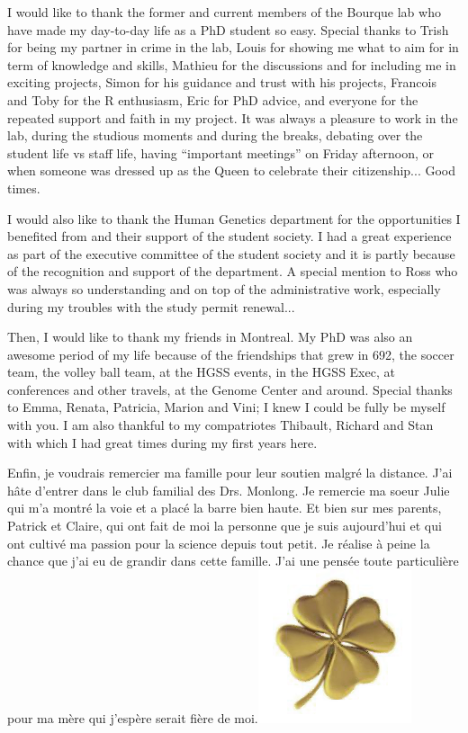 I would like to thank the former and current members of the Bourque lab who have made my day-to-day life as a PhD student so easy.
Special thanks to Trish for being my partner in crime in the lab, Louis for showing me what to aim for in term of knowledge and skills, Mathieu for the discussions and for including me in exciting projects, Simon for his guidance and trust with his projects, Francois and Toby for the R enthusiasm, Eric for PhD advice, and everyone for the repeated support and faith in my project.
It was always a pleasure to work in the lab, during the studious moments and during the breaks, debating over the student life vs staff life, having ``important meetings'' on Friday afternoon, or when someone was dressed up as the Queen to celebrate their citizenship... Good times.

I would also like to thank the Human Genetics department for the opportunities I benefited from and their support of the student society.
I had a great experience as part of the executive committee of the student society and it is partly because of the recognition and support of the department.
A special mention to Ross who was always so understanding and on top of the administrative work, especially during my troubles with the study permit renewal...

Then, I would like to thank my friends in Montreal.
My PhD was also an awesome period of my life because of the friendships that grew in 692, the soccer team, the volley ball team, at the HGSS events, in the HGSS Exec, at conferences and other travels, at the Genome Center and around.
Special thanks to Emma, Renata, Patricia, Marion and Vini; I knew I could be fully be myself with you.
I am also thankful to my compatriotes Thibault, Richard and Stan with which I had great times during my first years here.

Enfin, je voudrais remercier ma famille pour leur soutien malgré la distance.
J'ai hâte d'entrer dans le club familial des Drs. Monlong.
Je remercie ma soeur Julie qui m'a montré la voie et a placé la barre bien haute.
Et bien sur mes parents, Patrick et Claire, qui ont fait de moi la personne que je suis aujourd'hui et qui ont cultivé ma passion pour la science depuis tout petit.
Je réalise à peine la chance que j'ai eu de grandir dans cette famille.
J'ai une pensée toute particulière pour ma mère qui j'espère serait fière de moi.\includegraphics[height=.8em]{clover.png}

